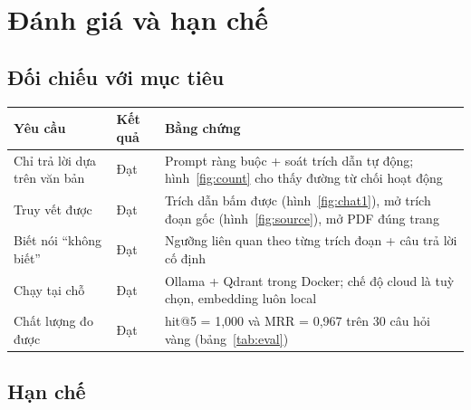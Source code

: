 \section{Đánh giá và hạn chế}

\subsection{Đối chiếu với mục tiêu}

\begin{rtable}
\begin{tabular}{@{}p{} p{} p{}@{}}
\toprule
\textbf{Yêu cầu} & \textbf{Kết quả} & \textbf{Bằng chứng} \\
\midrule
Chỉ trả lời dựa trên văn bản & Đạt & Prompt ràng buộc + soát trích dẫn tự động; hình~\ref{fig:count} cho thấy đường từ chối hoạt động \\
Truy vết được & Đạt & Trích dẫn bấm được (hình~\ref{fig:chat1}), mở trích đoạn gốc (hình~\ref{fig:source}), mở PDF đúng trang \\
Biết nói “không biết” & Đạt & Ngưỡng liên quan theo từng trích đoạn + câu trả lời cố định \\
Chạy tại chỗ & Đạt & Ollama + Qdrant trong Docker; chế độ cloud là tuỳ chọn, embedding luôn local \\
Chất lượng đo được & Đạt & hit@5 = 1,000 và MRR = 0,967 trên 30 câu hỏi vàng (bảng~\ref{tab:eval}) \\
\bottomrule
\end{tabular}
\label{tab:doichieu}
\end{rtable}

\subsection{Hạn chế}

